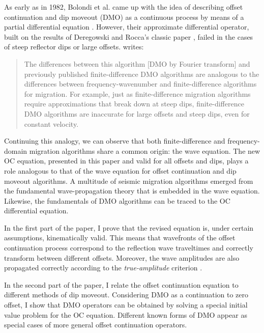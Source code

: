 As early as in 1982, Bolondi et al.  came up with the idea of
describing offset continuation and dip moveout (DMO) as a continuous
process by means of a partial differential equation
\cite[]{GPR30-06-08130828}.  However, their approximate differential
operator, built on the results of Deregowski and Rocca's classic paper
\cite[]{GPR29-03-03740406}, failed in the cases of steep reflector dips
or large offsets.  \cite{Hale.sepphd.36} writes:
\begin{quote}
  The differences between this algorithm [DMO by Fourier transform]
  and previously published finite-difference DMO algorithms are
  analogous to the differen\-ces be\-t\-ween
  fre\-qu\-en\-cy-wave\-num\-ber
  \cite[]{GEO43-01-00230048,GEO43-07-13421351} and
  fi\-nite-dif\-fe\-rence \cite[]{Claerbout.fgdp.76} algorithms for
  migration. For example, just as finite-difference migration
  algorithms require approximations that break down at steep dips,
  finite-difference DMO algorithms are inaccurate for large offsets
  and steep dips, even for constant velocity.
\end{quote}
Continuing this analogy, we can observe that both finite-difference
and frequency-domain migration algorithms share a common origin: the
wave equation. The new OC equation, presented in this paper and valid
for all offsets and dips, plays a role analogous to that of the wave
equation for offset continuation and dip moveout algorithms. A
multitude of seismic migration algorithms emerged from the fundamental
wave-propagation theory that is embedded in the wave equation.
Likewise, the fundamentals of DMO algorithms can be traced to the OC
differential equation.

In the first part of the paper, I prove that the revised equation
is, under certain assumptions, kinematically valid. This means that
wavefronts of the offset continuation process correspond to the
reflection wave traveltimes and correctly transform between different
offsets.  Moreover, the wave amplitudes are also propagated correctly
according to the \emph{true-amplitude} criterion \cite[]{GEO58-01-00470066}. 

In the second part of the paper, I relate the offset continuation
equation to different methods of dip moveout. Considering DMO as a
continuation to zero offset, I show that DMO operators can be obtained
by solving a special initial value problem for the OC
equation.  Different known forms of DMO \cite[]{DMObook} appear as special
cases of more general offset continuation operators.

